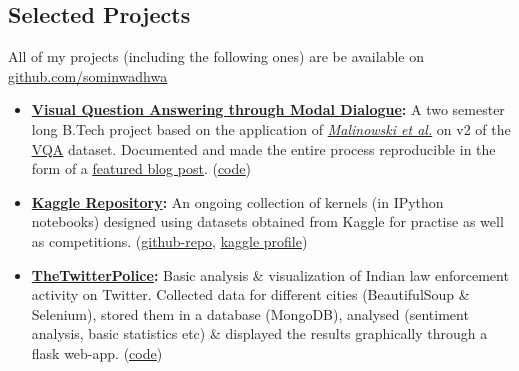 \documentclass[margin,line]{res}
\begin{document}
\begin{resume}
\section{\sc Selected Projects}
All of my projects (including the following ones) are be available on {\href{https://github.com/sominwadhwa}{\underline{github.com/sominwadhwa}}}\\
\begin{itemize}[leftmargin=*]
\item {\bf {\href{https://github.com/sominwadhwa/vqamd_floyd}{Visual Question Answering through Modal Dialogue}:}}
A two semester long B.Tech project based on the application of \textit{\href{https://arxiv.org/pdf/1505.01121.pdf}{Malinowski et al.}} on v2 of the {\href{http://visualqa.org/}{\underline{VQA}}} dataset. Documented and made the entire process reproducible in the form of a \href{https://blog.floydhub.com/asking-questions-to-images-with-deep-learning/}{\underline{featured blog post}}. ({\href{https://github.com/sominwadhwa/vqamd_floyd}{\underline{code}}})
\item {\bf {\href{https://github.com/sominwadhwa/Kaggle}{Kaggle Repository}:}}
An ongoing collection of kernels (in IPython notebooks) designed using datasets obtained from Kaggle for practise as well as competitions. ({\href{https://github.com/sominwadhwa/Kaggle}{\underline{github-repo}}}, {\href{https://www.kaggle.com/sominwadhwa}{\underline{kaggle profile}}})
\item {\bf {\href{https://github.com/sominwadhwa/TheTwitterPolice}{TheTwitterPolice}:}}
Basic analysis \& visualization of Indian law enforcement activity on Twitter. Collected data for different cities (BeautifulSoup \& Selenium), stored them in a database (MongoDB), analysed (sentiment analysis, basic statistics etc) \& displayed the results graphically through a flask web-app. ({\href{https://github.com/sominwadhwa/TheTwitterPolice}{\underline{code}}})
\end{itemize}

\iffalse
\section{\sc Technical Skills}
{\bf Strongest Areas}: Machine Learning (Classification, Regression, Feature Engineering), Algorithms, Statistical Data Analysis\\
{\bf Languages/Tools/Software}: Python (scikit-learn, Keras, NumPy, Pandas \& others), Java, SQL, MongoDB, \LaTeX, MS Excel
\fi


\end{resume}
\end{document}
